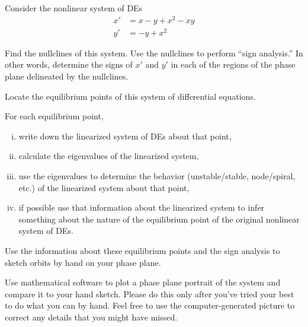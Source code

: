\documentclass[boxes]{gsypset}
\begin{document}
	\begin{problem}
		Consider the nonlinear system of DEs
		\begin{align*}
			x' &= x - y + x^2 - xy \\
			y' &= -y + x^2
		\end{align*}
		
		\begin{subproblems}
			\subproblem 
				Find the nullclines of this system. 
				Use the nullclines to perform ``sign analysis.'' 
				In other words, determine the signs of $x'$ and $y'$ 
				in each of the regions of the phase plane delineated by the nullclines.
				\begin{solution}
					
				\end{solution}
			\subproblem Locate the equilibrium points of this system of differential equations.
				\begin{solution}
					
				\end{solution}
			\subproblem For each equilibrium point,
				\begin{enumerate}[(i)]
					\item write down the linearized system of DEs about that point,
					\item calculate the eigenvalues of the linearized system,
					\item 
						use the eigenvalues to determine the behavior 
						(unstable/stable, node/spiral, etc.) of the linearized system about that point,
					\item 
						if possible use that information about the linearized system to infer 
						something about the nature of the equilibrium point 
						of the original nonlinear system of DEs.
				\end{enumerate}
				\begin{solution}
					
				\end{solution}
			\subproblem 
				Use the information about these equilibrium points and the sign analysis to 
				sketch orbits by hand on your phase plane.
				\begin{solution}
					
				\end{solution}
			\subproblem 
				Use mathematical software to plot a phase plane portrait of the system and 
				compare it to your hand sketch. 
				Please do this only after you've tried your best to do what you can by hand. 
				Feel free to use the computer-generated picture to correct any details 
				that you might have missed.
				\begin{solution}
					
				\end{solution}
		\end{subproblems}
	\end{problem}
	
\end{document}
